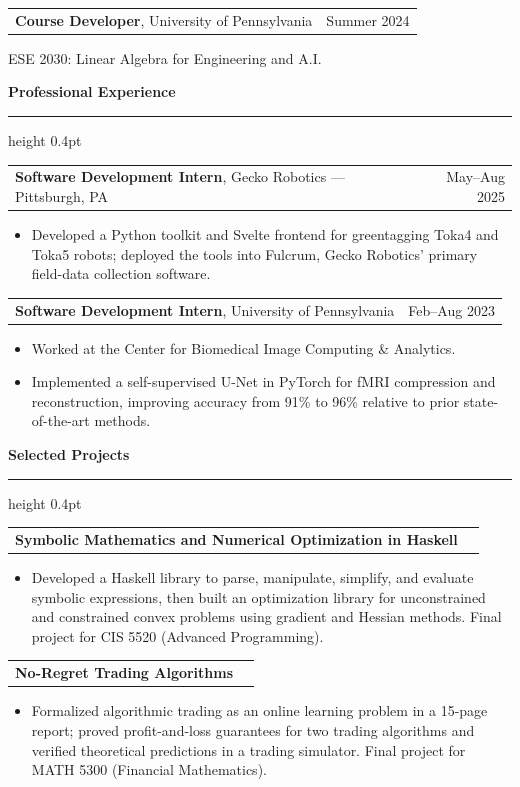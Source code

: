 \documentclass[10pt,letterpaper]{article}
\makeatletter
\newcommand{\cvsection}[1]{%
  \par\addpenalty{-300}\addvspace{12pt}%
  {\large\bfseries #1\par}%
  \nobreak\vspace{3pt}\hrule height 0.4pt%
  \nobreak\vspace{6pt}\nobreak
}
\newcommand{\entrysep}{\par\addvspace{6pt}}
\newcommand{\entry}[2]{\noindent\begin{tabularx}{\textwidth}{@{}Xr@{}}#1 & #2\end{tabularx}\par\nobreak\vspace{2pt}}
\makeatother
\begin{document}
\begin{samepage}
\entry{\textbf{Course Developer}, University of Pennsylvania}{Summer 2024}
ESE 2030: Linear Algebra for Engineering and A.I.\par
\end{samepage}\entrysep
\cvsection{Professional Experience}
\begin{samepage}
\entry{\textbf{Software Development Intern}, Gecko Robotics --- Pittsburgh, PA}{May--Aug 2025}
\begin{itemize}
\item Developed a Python toolkit and Svelte frontend for greentagging Toka4 and Toka5 robots; deployed the tools into Fulcrum, Gecko Robotics' primary field-data collection software.
\end{itemize}
\end{samepage}\entrysep
\begin{samepage}
\entry{\textbf{Software Development Intern}, University of Pennsylvania}{Feb--Aug 2023}
\begin{itemize}
\item Worked at the Center for Biomedical Image Computing \& Analytics.
\item Implemented a self-supervised U-Net in PyTorch for fMRI compression and reconstruction, improving accuracy from 91\% to 96\% relative to prior state-of-the-art methods.
\end{itemize}
\end{samepage}\entrysep
\cvsection{Selected Projects}
\begin{samepage}
\entry{\textbf{Symbolic Mathematics and Numerical Optimization in Haskell}}{}
\begin{itemize}
\item Developed a Haskell library to parse, manipulate, simplify, and evaluate symbolic expressions, then built an optimization library for unconstrained and constrained convex problems using gradient and Hessian methods. Final project for CIS 5520 (Advanced Programming).
\end{itemize}
\end{samepage}\entrysep
\begin{samepage}
\entry{\textbf{No-Regret Trading Algorithms}}{}
\begin{itemize}
\item Formalized algorithmic trading as an online learning problem in a 15-page report; proved profit-and-loss guarantees for two trading algorithms and verified theoretical predictions in a trading simulator. Final project for MATH 5300 (Financial Mathematics).
\end{itemize}
\end{samepage}\entrysep
\end{document}
